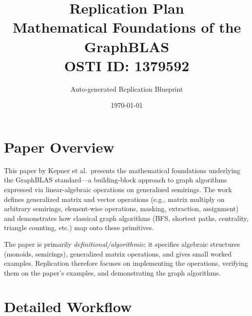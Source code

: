 \documentclass[11pt,a4paper]{article}
\title{\textbf{Replication Plan}\\[0.5em]
\large Mathematical Foundations of the GraphBLAS\\[0.3em]
\normalsize OSTI ID: 1379592}
\author{Auto-generated Replication Blueprint}
\date{\today}
\begin{document}
\maketitle
\tableofcontents
\newpage

\section{Paper Overview}
This paper by Kepner et al.\ presents the mathematical foundations underlying the GraphBLAS standard---a building-block approach to graph algorithms expressed via linear-algebraic operations on generalized semirings. The work defines generalized matrix and vector operations (e.g., matrix multiply on arbitrary semirings, element-wise operations, masking, extraction, assignment) and demonstrates how classical graph algorithms (BFS, shortest paths, centrality, triangle counting, etc.) map onto these primitives.

The paper is primarily \emph{definitional/algorithmic}: it specifies algebraic structures (monoids, semirings), generalized matrix operations, and gives small worked examples. Replication therefore focuses on implementing the operations, verifying them on the paper's examples, and demonstrating the graph algorithms.

\section{Detailed Workflow}
\end{document}

